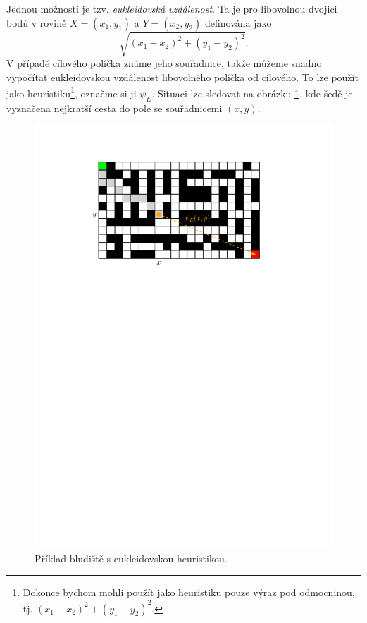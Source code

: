 Jednou možností je tzv. \emph{eukleidovská vzdálenost}. Ta je pro libovolnou dvojici bodů v rovině $X=(x_1,y_1)$ a $Y=(x_2,y_2)$ definována jako
\[\sqrt{(x_1-x_2)^2+(y_1-y_2)^2}.\]
V případě cílového políčka známe jeho souřadnice, takže můžeme snadno vypočítat eukleidovskou vzdálenost libovolného políčka od cílového. To lze použít jako heuristiku\footnote{Dokonce bychom mohli použít jako heuristiku pouze výraz pod odmocninou, tj. $(x_1-x_2)^2+(y_1-y_2)^2$.}, označme si ji $\psi_E$. Situaci lze sledovat na obrázku \ref{fig:astar_bludiste_euclid}, kde šedě je vyznačena nejkratší cesta do pole se souřadnicemi $(x,y)$.
\begin{figure}[h]
    \centering
    \includegraphics[scale=\graphimgsize]{01-grafalgo/images/ch01_astar_mrizka_euclid.pdf}
    \caption{Příklad bludiště s eukleidovskou heuristikou.}
    \label{fig:astar_bludiste_euclid}
\end{figure}
